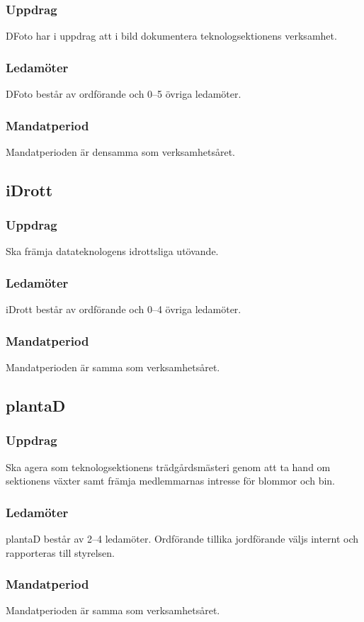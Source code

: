 \subsubsection{Uppdrag}
DFoto har i uppdrag att i bild dokumentera teknologsektionens verksamhet.
\subsubsection{Ledamöter}
DFoto består av ordförande och 0--5 övriga ledamöter.
\subsubsection{Mandatperiod}
Mandatperioden är densamma som verksamhetsåret.

\subsection{iDrott}
\subsubsection{Uppdrag}
Ska främja datateknologens idrottsliga utövande. 
\subsubsection{Ledamöter}
iDrott består av ordförande och 0--4 övriga ledamöter. 
\subsubsection{Mandatperiod}
Mandatperioden är samma som verksamhetsåret. 

\subsection{plantaD}
\subsubsection{Uppdrag}
Ska agera som teknologsektionens trädgårdsmästeri genom att ta hand om sektionens växter samt främja medlemmarnas intresse för blommor och bin.
\subsubsection{Ledamöter}
plantaD består av 2--4 ledamöter. Ordförande tillika jordförande väljs internt och rapporteras till styrelsen.
\subsubsection{Mandatperiod}
Mandatperioden är samma som verksamhetsåret.

